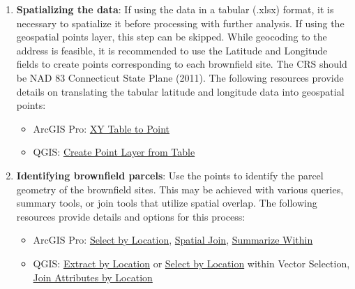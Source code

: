 \documentclass[
  letterpaper,
  DIV=11,
  numbers=noendperiod]{scrreprt}
\providecommand{\tightlist}{%
  \setlength{\itemsep}{0pt}\setlength{\parskip}{0pt}}
\begin{document}
\begin{enumerate}
\def\labelenumi{\arabic{enumi}.}
\item
  \textbf{Spatializing the data}: If using the data in a tabular (.xlsx)
  format, it is necessary to spatialize it before processing with
  further analysis. If using the geospatial points layer, this step can
  be skipped. While geocoding to the address is feasible, it is
  recommended to use the Latitude and Longitude fields to create points
  corresponding to each brownfield site. The CRS should be NAD 83
  Connecticut State Plane (2011). The following resources provide
  details on translating the tabular latitude and longitude data into
  geospatial points:

  \begin{itemize}
  \tightlist
  \item
    ArcGIS Pro:
    \href{https://doc.esri.com/en/arcgis-pro/latest/tool-reference/data-management/xy-table-to-point.html?tabs=dialog}{XY
    Table to Point}
  \item
    QGIS:
    \href{https://qgis-tuts-wu.readthedocs.io/en/latest/land_degradation_development/interpolation/loading_table.html}{Create
    Point Layer from Table}
  \end{itemize}
\item
  \textbf{Identifying brownfield parcels}: Use the points to identify
  the parcel geometry of the brownfield sites. This may be achieved with
  various queries, summary tools, or join tools that utilize spatial
  overlap. The following resources provide details and options for this
  process:

  \begin{itemize}
  \tightlist
  \item
    ArcGIS Pro:
    \href{https://doc.esri.com/en/arcgis-pro/latest/help/mapping/navigation/select-features-by-location.html}{Select
    by Location},
    \href{https://doc.esri.com/en/arcgis-pro/latest/tool-reference/analysis/spatial-join.html?tabs=dialog}{Spatial
    Join},
    \href{https://doc.esri.com/en/arcgis-pro/latest/tool-reference/analysis/summarize-within.html?tabs=dialog}{Summarize
    Within}
  \item
    QGIS:
    \href{https://docs.qgis.org/3.44/en/docs/user_manual/processing_algs/qgis/vectorselection.html\#extract-by-location}{Extract
    by Location} or
    \href{https://docs.qgis.org/3.44/en/docs/user_manual/processing_algs/qgis/vectorselection.html\#select-by-location}{Select
    by Location} within Vector Selection,
    \href{https://www.qgistutorials.com/en/docs/3/performing_spatial_joins.html}{Join
    Attributes by Location}
  \end{itemize}
\end{enumerate}
\end{document}
